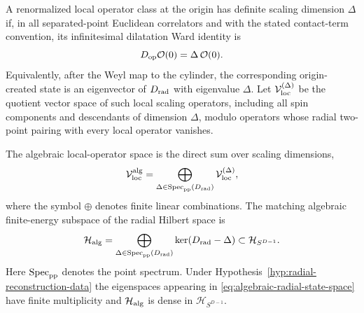 \begin{definition}
\label{def:scaling-operator-classes}
A renormalized local operator class at the origin has definite scaling
dimension \(\Delta\) if, in all separated-point Euclidean correlators and with
the stated contact-term convention, its infinitesimal dilatation Ward identity
is
\[
  D_{\rm op}\mathcal O(0)=\Delta\,\mathcal O(0).
\]
Equivalently, after the Weyl map to the cylinder, the corresponding
origin-created state is an eigenvector of \(D_{\rm rad}\) with eigenvalue
\(\Delta\).  Let \(\mathcal V_{\rm loc}^{(\Delta)}\) be the quotient vector
space of such local scaling operators, including all spin components and
descendants of dimension \(\Delta\), modulo operators whose radial two-point
pairing with every local operator vanishes.

The algebraic local-operator space is the direct sum over scaling dimensions,
\begin{equation}
  \mathcal V_{\rm loc}^{\rm alg}
  =
  \bigoplus_{\Delta\in\operatorname{Spec}_{\rm pp}(D_{\rm rad})}
  \mathcal V_{\rm loc}^{(\Delta)} ,
  \label{eq:algebraic-local-operator-space}
\end{equation}
where the symbol \(\oplus\) denotes finite linear combinations.  The matching
algebraic finite-energy subspace of the radial Hilbert space is
\begin{equation}
  \mathcal H_{\rm alg}
  =
  \bigoplus_{\Delta\in\operatorname{Spec}_{\rm pp}(D_{\rm rad})}
  \ker(D_{\rm rad}-\Delta)
  \subset
  \mathcal H_{S^{D-1}} .
  \label{eq:algebraic-radial-state-space}
\end{equation}
Here \(\operatorname{Spec}_{\rm pp}\) denotes the point spectrum.  Under
Hypothesis~\ref{hyp:radial-reconstruction-data} the eigenspaces appearing in
\eqref{eq:algebraic-radial-state-space} have finite multiplicity and
\(\mathcal H_{\rm alg}\) is dense in \(\mathcal H_{S^{D-1}}\).
\end{definition}


